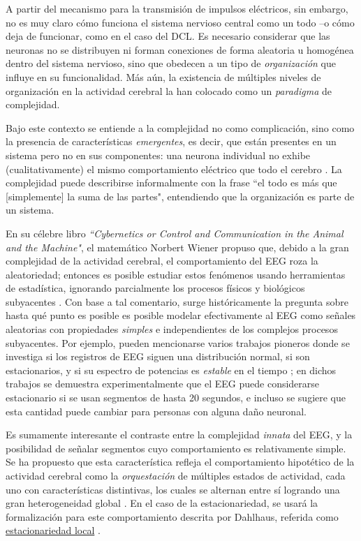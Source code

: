 \documentclass[12pt,letterpaper]{book}
\begin{document}
A partir del mecanismo para la transmisión de impulsos eléctricos, sin embargo, no es muy claro cómo funciona el sistema nervioso central como un todo --o cómo deja de funcionar, como en el caso del DCL.
%
Es necesario considerar que las neuronas no se distribuyen ni forman conexiones de forma aleatoria u homogénea dentro del sistema nervioso, sino que obedecen a un tipo de \textit{organización} que influye en su funcionalidad.
%
Más aún, la existencia de múltiples niveles de organización en la actividad cerebral la han colocado como un \textit{paradigma} de complejidad.

Bajo este contexto se entiende a la complejidad no como complicación, sino como la presencia de características \textit{emergentes}, es decir, que están presentes en un sistema pero no en sus componentes: una neurona individual no exhibe (cualitativamente) el mismo comportamiento eléctrico que todo el cerebro \cite{Werner09}.
%
La complejidad puede describirse informalmente con la frase ``el todo es más que [simplemente] la suma de las partes", entendiendo que la organización es parte de un sistema.

En su célebre libro \textit{``Cybernetics or Control and Communication in the Animal and the Machine"}, el matemático Norbert Wiener propuso que, debido a la gran complejidad de la actividad cerebral, el comportamiento del EEG roza la aleatoriedad; entonces es posible estudiar estos fenómenos usando herramientas de estadística, ignorando parcialmente los procesos físicos y biológicos subyacentes
\cite{wiener61}.
%
Con base a tal comentario, surge históricamente la pregunta sobre hasta qué punto es posible es posible modelar efectivamente al EEG como señales aleatorias con propiedades \textit{simples} e independientes de los complejos procesos subyacentes.
%
Por ejemplo, pueden mencionarse varios trabajos pioneros donde se investiga si los registros de EEG siguen una distribución normal, si son estacionarios, y si su espectro de potencias es \textit{estable} en el tiempo \cite{Cohen77,Kawabata73,McEwen75,Sugimoto78}; en dichos trabajos se demuestra experimentalmente que el EEG puede considerarse estacionario si se usan segmentos de hasta 20 segundos, e incluso se sugiere que esta cantidad puede cambiar para personas con alguna daño neuronal.

Es sumamente interesante el contraste entre la complejidad \textit{innata} del EEG, y la posibilidad de señalar segmentos cuyo comportamiento es relativamente simple.
%
Se ha propuesto que esta característica refleja el comportamiento hipotético de la actividad cerebral como la \textit{orquestación} de múltiples estados de actividad, cada uno con características distintivas, los cuales se alternan entre sí logrando una gran heterogeneidad global \cite{kaplan2000application}.
%
En el caso de la estacionariedad, se usará la formalización para este comportamiento descrita por Dahlhaus, referida como \underline{estacionariedad local} \cite{Dahlhaus97}.
\end{document}
